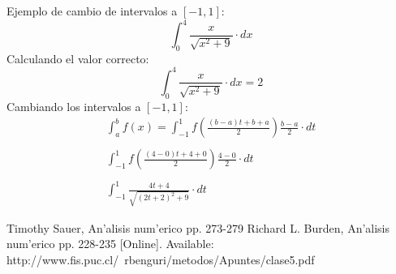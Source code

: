 \documentclass[12pt]{article}
\begin{document}
			Ejemplo de cambio de intervalos a $[-1,1]$:
			\begin{equation}
				\int_{0}^{4}\frac{x}{\sqrt{x^{2}+9}}\cdot dx
			\end{equation}
			Calculando el valor correcto:
			\begin{equation}
				\int_{0}^{4}\frac{x}{\sqrt{x^{2}+9}}\cdot dx=2
			\end{equation}
			Cambiando los intervalos a $[-1,1]$:
			\begin{equation}
				\begin{array}{lcc}
					\int_{a}^{b}f(x)=\int_{-1}^{1}f(\frac{(b-a)t+b+a}{2})\frac{b-a}{2}\cdot dt\\
					\\
					\int_{-1}^{1}f(\frac{(4-0)t+4+0}{2})\frac{4-0}{2}\cdot dt\\
					\\
					\int_{-1}^{1}\frac{4t+4}{\sqrt{(2t+2)^{2}+9}}\cdot dt
				\end{array}
			\end{equation}
		\begin{thebibliography}{00}
			 Timothy Sauer, An'alisis num'erico pp. 273-279
			 Richard L. Burden, An'alisis num'erico pp. 228-235 
			. Available: http://www.fis.puc.cl/~rbenguri/metodos/Apuntes/clase5.pdf
		\end{thebibliography}
		
	
	
	
\end{document}
